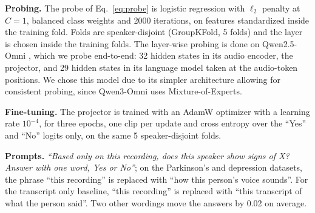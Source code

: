 \documentclass{article}
\begin{document}
\noindent\textbf{Probing.} The probe of Eq.~\ref{eq:probe} is logistic regression with $\ell_2$ penalty at $C=1$, balanced class weights and 2000 iterations, on features standardized inside the training fold. Folds are speaker-disjoint (GroupKFold, 5 folds) and the layer is chosen inside the training folds. %
The layer-wise probing is done on Qwen2.5-Omni \cite{qwen25omni}, which we probe end-to-end: 32 hidden states in its audio encoder, the projector, and 29 hidden states in its language model taken at the audio-token positions. We chose this model due to its simpler architecture allowing for consistent probing, since Qwen3-Omni \cite{qwen3omni} uses Mixture-of-Experts.

\noindent\textbf{Fine-tuning.} The projector is trained with an AdamW optimizer with a learning rate $10^{-4}$, for three epochs, one clip per update and cross entropy over the ``Yes'' and ``No'' logits only, on the same 5 speaker-disjoint folds.

\noindent\textbf{Prompts.} \emph{``Based only on this recording, does this speaker show signs of X? Answer with one word, Yes or No''}; on the Parkinson's and depression datasets, the phrase ``this recording'' is replaced with ``how this person's voice sounds''.  For the transcript only baseline, ``this recording'' is replaced with ``this transcript of what the person said''. Two other wordings move the answers by 0.02 on average. %
\end{document}
